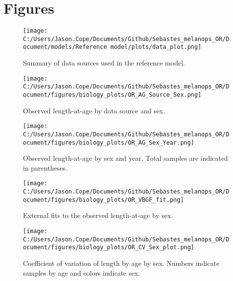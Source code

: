 \documentclass[11pt,
  english,
  letterpaper,
]{article}
\begin{document}
\newpage



\newpage

\clearpage

\hypertarget{figures}{%
\section{Figures}\label{figures}}

\begin{figure}
\centering
\texttt{[image: C:/Users/Jason.Cope/Documents/Github/Sebastes\_melanops\_OR/Document/models/Reference model/plots/data\_plot.png]}
\caption{Summary of data sources used in the reference model.\label{fig:data-plot}}
\end{figure}

\begin{figure}
\centering
\texttt{[image: C:/Users/Jason.Cope/Documents/Github/Sebastes\_melanops\_OR/Document/figures/biology\_plots/OR\_AG\_Source\_Sex.png]}
\caption{Observed length-at-age by data source and sex.\label{fig:len-age-data-sex}}
\end{figure}

\begin{figure}
\centering
\texttt{[image: C:/Users/Jason.Cope/Documents/Github/Sebastes\_melanops\_OR/Document/figures/biology\_plots/OR\_AG\_Sex\_Year.png]}
\caption{Observed length-at-age by sex and year. Total samples are indicated in parentheses.\label{fig:len-age-sex-year}}
\end{figure}

\begin{figure}
\centering
\texttt{[image: C:/Users/Jason.Cope/Documents/Github/Sebastes\_melanops\_OR/Document/figures/biology\_plots/OR\_VBGF\_fit.png]}
\caption{External fits to the observed length-at-age by sex.\label{fig:len-age-fit}}
\end{figure}

\begin{figure}
\centering
\texttt{[image: C:/Users/Jason.Cope/Documents/Github/Sebastes\_melanops\_OR/Document/figures/biology\_plots/OR\_CV\_Sex\_plot.png]}
\caption{Coefficient of variation of length by age by sex. Numbers indicate samples by age and colors indicate sex.\label{fig:cv-lt-age}}
\end{figure}
\end{document}
